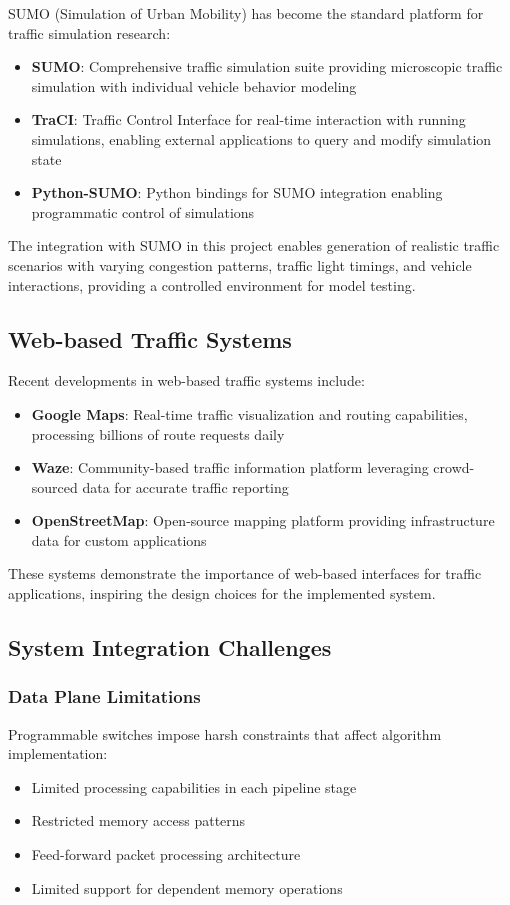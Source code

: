 SUMO (Simulation of Urban Mobility) has become the standard platform for traffic simulation research:

\begin{itemize}
    \item \textbf{SUMO}: Comprehensive traffic simulation suite providing microscopic traffic simulation with individual vehicle behavior modeling
    \item \textbf{TraCI}: Traffic Control Interface for real-time interaction with running simulations, enabling external applications to query and modify simulation state
    \item \textbf{Python-SUMO}: Python bindings for SUMO integration enabling programmatic control of simulations
\end{itemize}

The integration with SUMO in this project enables generation of realistic traffic scenarios with varying congestion patterns, traffic light timings, and vehicle interactions, providing a controlled environment for model testing.

\subsection{Web-based Traffic Systems}

Recent developments in web-based traffic systems include:

\begin{itemize}
    \item \textbf{Google Maps}: Real-time traffic visualization and routing capabilities, processing billions of route requests daily
    \item \textbf{Waze}: Community-based traffic information platform leveraging crowd-sourced data for accurate traffic reporting
    \item \textbf{OpenStreetMap}: Open-source mapping platform providing infrastructure data for custom applications
\end{itemize}

These systems demonstrate the importance of web-based interfaces for traffic applications, inspiring the design choices for the implemented system.

\subsection{System Integration Challenges}

\subsubsection{Data Plane Limitations}
Programmable switches impose harsh constraints that affect algorithm implementation:
\begin{itemize}
    \item Limited processing capabilities in each pipeline stage
    \item Restricted memory access patterns
    \item Feed-forward packet processing architecture
    \item Limited support for dependent memory operations
\end{itemize}

